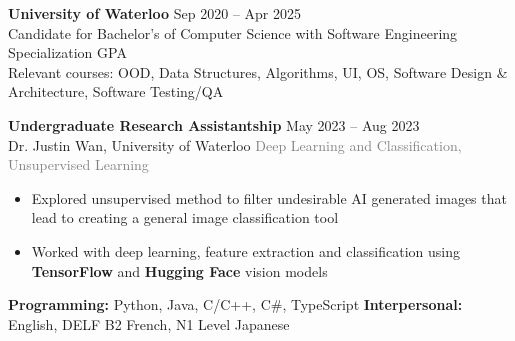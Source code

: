 \documentclass[9pt]{developercv} %
\begin{document}


\begin{minipage}[t]{\textwidth}
	\vspace{-\baselineskip}
	\textbf{University of Waterloo} \hfill Sep 2020 -- Apr 2025 \\
	Candidate for Bachelor's of Computer Science with Software Engineering Specialization  GPA \\
	Relevant courses: OOD, Data Structures, Algorithms, UI, OS, Software Design \& Architecture, Software Testing/QA
\end{minipage}


\begin{minipage}[t]{\textwidth}
	\vspace{-\baselineskip}
	\textbf{Undergraduate Research Assistantship} \hfill May 2023 -- Aug 2023\\
	Dr. Justin Wan, \; University of Waterloo \hfill \textcolor{gray}{Deep Learning and Classification, Unsupervised Learning}
	\begin{itemize}[noitemsep,topsep=0pt]
		\item Explored unsupervised method to filter undesirable AI generated images that lead to creating a general image classification tool
		\item Worked with deep learning, feature extraction and classification using \textbf{TensorFlow} and \textbf{Hugging Face} vision models
	\end{itemize}
\end{minipage}


\begin{minipage}[t]{\textwidth}
	\vspace{-\baselineskip}
	\textbf{Programming:} Python, Java, C/C++, C\#, TypeScript
	\hfill
	\textbf{Interpersonal:} English, DELF B2 French, N1 Level Japanese
\end{minipage}


\end{document}
